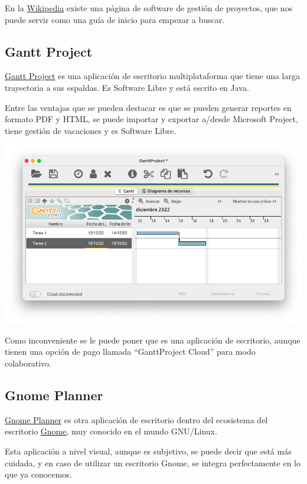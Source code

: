 \documentclass{\ClassPath/viu-tfm-template}
\begin{document}
En la \href{https://en.wikipedia.org/wiki/Comparison_of_project_management_software}{Wikipedia} existe una página de software de gestión de proyectos, que nos puede servir como una guía de inicio para empezar a buscar.

\subsection{Gantt Project}

\href{https://www.ganttproject.biz/}{Gantt Project} es una aplicación de escritorio multiplataforma que tiene una larga trayectoria a sus espaldas. Es Software Libre y está escrito en Java.

Entre las ventajas que se pueden destacar es que se pueden generar reportes en formato PDF y HTML, se puede importar y exportar a/desde Microsoft Project, tiene gestión de vacaciones y es Software Libre.


\begin{center}
    \includegraphics[width=0.7\linewidth]{img/ganttproject.png}
\end{center}

Como inconveniente se le puede poner que es una aplicación de escritorio, aunque tienen una opción de pago llamada “GanttProject Cloud” para modo colaborativo.

\subsection{Gnome Planner}
\href{https://wiki.gnome.org/Apps/Planner}{Gnome Planner} es otra aplicación de escritorio dentro del ecosistema del escritorio \href{https://www.gnome.org/}{Gnome}, muy conocido en el mundo GNU/Linux.

Esta aplicación a nivel visual, aunque es subjetivo, se puede decir que está más cuidada, y en caso de utilizar un escritorio Gnome, se integra perfectamente en lo que ya conocemos.
\end{document}
